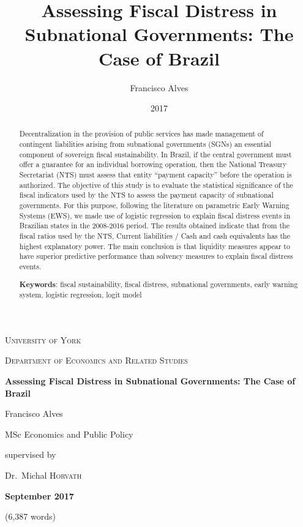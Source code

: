 \documentclass[12pt,oneside,a4paper]{report}
\title{Assessing Fiscal Distress in Subnational Governments: The Case of Brazil}
\author{Francisco Alves}
\date{2017}
\begin{document}
\begin{titlepage}
    \centering
    {\scshape\LARGE University of York\par}
    \vspace{1cm}
    {\scshape\Large Department of Economics and Related Studies\par}
    \vspace{1.5cm}
    {\huge\bfseries Assessing Fiscal Distress in Subnational Governments: The Case of Brazil\par}
    \vspace{2cm}
    {\Large Francisco Alves\par}
    {MSc Economics and Public Policy\par}
    \vfill
    supervised by\par
    Dr.~Michal \textsc{Horvath}

    \vfill

    {\large \textbf{September 2017}\par}
    (6,387 words)
\end{titlepage}

\begin{abstract}
Decentralization in the provision of public services has made management of contingent liabilities arising from subnational governments (SGNs) an essential component of sovereign fiscal sustainability. In Brazil, if the central government must offer a guarantee for an individual borrowing operation, then the National Treasury Secretariat (NTS) must assess that entity ``payment capacity'' before the operation is authorized. The objective of this study is to evaluate the statistical significance of the fiscal indicators used by the NTS to assess the payment capacity of subnational governments. For this purpose, following the literature on parametric Early Warning Systems (EWS), we made use of logistic regression to explain fiscal distress events in Brazilian states in the 2008-2016 period. The results obtained indicate that from the fiscal ratios used by the NTS, Current liabilities / Cash and cash equivalents has the highest explanatory power. The main conclusion is that liquidity measures appear to have superior predictive performance than solvency measures to explain fiscal distress events.

\vspace{5mm}
\noindent
\textbf{Keywords}: fiscal sustainability, fiscal distress, subnational governments, early warning system, logistic regression, logit model

\vfill
\end{abstract}
\end{document}
